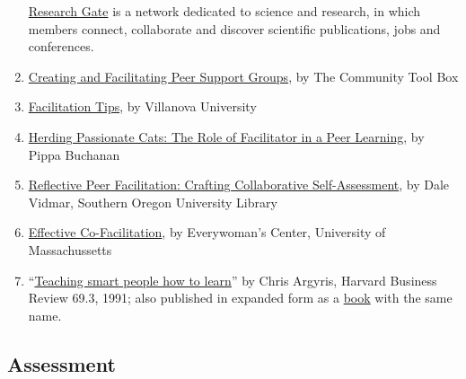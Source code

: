 \begin{enumerate}
  \href{http://www.researchgate.net/}{Research Gate} is a network
  dedicated to science and research, in which members connect,
  collaborate and discover scientific publications, jobs and
  conferences.
\item
  \href{http://ctb.ku.edu/en/tablecontents/section\_1180.aspx}{Creating
  and Facilitating Peer Support Groups}, by The Community Tool Box
\item
  \href{http://www1.villanova.edu/content/villanova/artsci/vcle/resources/toolkit/\_jcr\_content/pagecontent/download\_8/file.res/FacilitationTips.doc}{Facilitation
  Tips}, by Villanova University
\item
  \href{http://pippabuchanan.com/2011/09/04/herding-passionate-cats-the-role-of-facilitator-in-a-peer-learning-process/}{Herding
  Passionate Cats: The Role of Facilitator in a Peer Learning}, by Pippa
  Buchanan
\item
  \href{http://webpages.sou.edu/~vidmar/SOARS2008/vidmar.ppt}{Reflective
  Peer Facilitation: Crafting Collaborative Self-Assessment}, by Dale
  Vidmar, Southern Oregon University Library
\item
  \href{http://www.umass.edu/ewc/ea/Facilitation\%20Skills/important\%20tips.doc}{Effective
  Co-Facilitation}, by Everywoman's Center, University of Massachussetts
\item
  ``\href{www.ncsu.edu/park\_scholarships/pdf/chris\_argyris\_learning.pdf?}{Teaching
  smart people how to learn}'' by Chris Argyris, Harvard Business Review
  69.3, 1991; also published in expanded form as a
  \href{http://www.amazon.com/Teaching-People-Harvard-Business-Classics/dp/1422126005}{book}
  with the same name.
\end{enumerate}
\subsection{Assessment}

